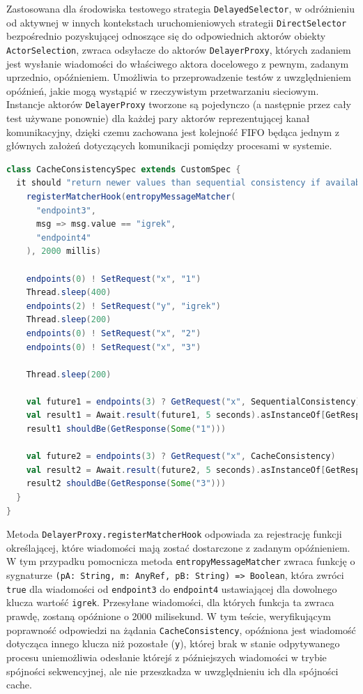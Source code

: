 Zastosowana dla środowiska testowego strategia \texttt{DelayedSelector}, w odróżnieniu od aktywnej w innych kontekstach uruchomieniowych strategii \texttt{DirectSelector} bezpośrednio pozyskującej odnoszące się do odpowiednich aktorów obiekty \texttt{ActorSelection}, zwraca odsyłacze do aktorów \texttt{DelayerProxy}, których zadaniem jest wysłanie wiadomości do właściwego aktora docelowego z pewnym, zadanym uprzednio, opóźnieniem. Umożliwia to przeprowadzenie testów z uwzględnieniem opóźnień, jakie mogą wystąpić w rzeczywistym przetwarzaniu sieciowym. Instancje aktorów \texttt{DelayerProxy} tworzone są pojedynczo (a następnie przez cały test używane ponownie) dla każdej pary aktorów reprezentującej kanał komunikacyjny, dzięki czemu zachowana jest kolejność FIFO będąca jednym z głównych założeń dotyczących komunikacji pomiędzy procesami w systemie.

\begin{lstlisting}[language=Scala,caption=Przykładowy test integracyjny wykorzystujący opóźnianie wiadomości]
class CacheConsistencySpec extends CustomSpec {
  it should "return newer values than sequential consistency if available" in {
    registerMatcherHook(entropyMessageMatcher(
      "endpoint3",
      msg => msg.value == "igrek",
      "endpoint4"
    ), 2000 millis)

    endpoints(0) ! SetRequest("x", "1")
    Thread.sleep(400)
    endpoints(2) ! SetRequest("y", "igrek")
    Thread.sleep(200)
    endpoints(0) ! SetRequest("x", "2")
    endpoints(0) ! SetRequest("x", "3")

    Thread.sleep(200)

    val future1 = endpoints(3) ? GetRequest("x", SequentialConsistency)
    val result1 = Await.result(future1, 5 seconds).asInstanceOf[GetResponse]
    result1 shouldBe(GetResponse(Some("1")))

    val future2 = endpoints(3) ? GetRequest("x", CacheConsistency)
    val result2 = Await.result(future2, 5 seconds).asInstanceOf[GetResponse]
    result2 shouldBe(GetResponse(Some("3")))
  }
}
\end{lstlisting}

Metoda \texttt{DelayerProxy.registerMatcherHook} odpowiada za rejestrację funkcji określającej, które wiadomości mają zostać dostarczone z zadanym opóźnieniem. W tym przypadku pomocnicza metoda \texttt{entropyMessageMatcher} zwraca funkcję o sygnaturze \texttt{(pA: String, m: AnyRef, pB: String) => Boolean}, która zwróci \texttt{true} dla wiadomości od \texttt{endpoint3} do \texttt{endpoint4} ustawiającej dla dowolnego klucza wartość \texttt{igrek}. Przesyłane wiadomości, dla których funkcja ta zwraca prawdę, zostaną opóźnione o 2000 milisekund. W tym teście, weryfikującym poprawność odpowiedzi na żądania \texttt{CacheConsistency}, opóźniona jest wiadomość dotycząca innego klucza niż pozostałe (\texttt{y}), której brak w stanie odpytywanego procesu uniemożliwia odesłanie którejś z późniejszych wiadomości w trybie spójności sekwencyjnej, ale nie przeszkadza w uwzględnieniu ich dla spójności cache.

